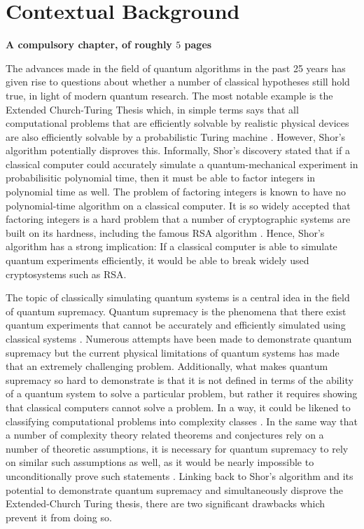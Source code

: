 \documentclass[ %
                    author={Manan Vaswani},
                supervisor={Dr. Raphael Clifford},
                    degree={MEng},
                     title={A multi-core CPU implementation \n of the classical Boson Sampling algorithm},
                  subtitle={},
                      type={},
                      year={2019} ]{dissertation}
\begin{document}
\mainmatter


\chapter{Contextual Background}
\label{chap:context}

{\bf A compulsory chapter,     of roughly $5$ pages}
\vspace{1cm} 

\noindent
The advances made in the field of quantum algorithms in the past 25 years has given rise to questions about whether a number of classical hypotheses still hold true, in light of modern quantum research. The most notable example is the Extended Church-Turing Thesis which, in simple terms says that all computational problems that are efficiently solvable by realistic physical devices are also efficiently solvable by a probabilistic Turing machine \cite{kaye2007}. However, Shor's algorithm \cite{shor1995} potentially disproves this. Informally, Shor's discovery stated that if a classical computer could accurately simulate a quantum-mechanical experiment in probabilisitic polynomial time, then it must be able to factor integers in polynomial time as well. The problem of factoring integers is known to have no polynomial-time algorithm on a classical computer. It is so widely accepted that factoring integers is a hard problem that a number of cryptographic systems are built on its hardness, including the famous RSA algorithm \cite{rsa1978}. Hence, Shor's algorithm has a strong implication: If a classical computer is able to simulate quantum experiments efficiently, it would be able to break widely used cryptosystems such as RSA.

The topic of classically simulating quantum systems is a central idea in the field of quantum supremacy. Quantum supremacy is the phenomena that there exist quantum experiments that cannot be accurately and efficiently simulated using classical systems \cite{preskill2012}. Numerous attempts have been made to demonstrate quantum supremacy but the current physical limitations of quantum systems has made that an extremely challenging problem. Additionally, what makes quantum supremacy so hard to demonstrate is that it is not defined in terms of the ability of a quantum system to solve a particular problem, but rather it requires showing that classical computers cannot solve a problem. In a way, it could be likened to classifying computational problems into complexity classes \cite{papadimitriou2003}. In the same way that a number of complexity theory related theorems and conjectures rely on a number of theoretic assumptions, it is necessary for quantum supremacy to rely on similar such assumptions as well, as it would be nearly impossible to unconditionally prove such statements \cite{harrow2017}. Linking back to Shor's algorithm and its potential to demonstrate quantum supremacy and simultaneously disprove the Extended-Church Turing thesis, there are two significant drawbacks which prevent it from doing so. 
\end{document}
